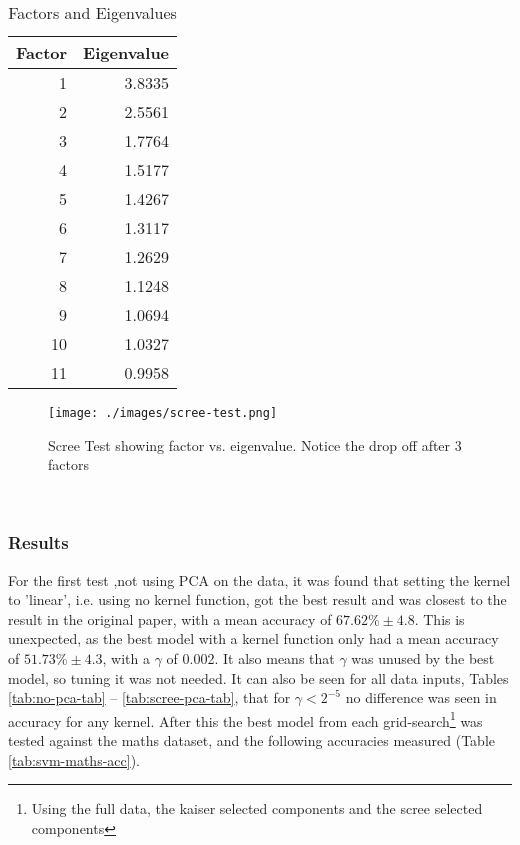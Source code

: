 \documentclass[12pt,a4paper,titlepage,twoside]{report}
\begin{document}
	\begin{minipage}[h]{\textwidth}	
		\begin{minipage}{0.3\textwidth}
		\begin{table}[H]
			\centering
			\begin{tabular}{|r|r|}
				\hline
				\textbf{Factor} & \textbf{Eigenvalue} \\ \hline
				1	&	3.8335 \\
				2	&	2.5561 \\
				3	&	1.7764 \\
				4	&	1.5177 \\
				5	&	1.4267 \\
				6	&	1.3117 \\
				7	&	1.2629 \\
				8	&	1.1248 \\
				9	&	1.0694 \\
				10 	&	1.0327 \\
				11	&   0.9958 \\
				\hline
			\end{tabular}
			\caption {Factors and Eigenvalues} 
			\label{tab:kaiser-tab} 
		\end{table}
		\end{minipage}%
		\hspace{0.6cm}%
		\begin{minipage}{0.7\textwidth}
		\begin{figure}[H]
			\centering
			\vspace{0.9cm}
			\texttt{[image: ./images/scree-test.png]}
			\caption{Scree Test showing factor vs. eigenvalue. Notice the drop off after 3 factors}
			\label{fig:scree-test}
		\end{figure}
		\end{minipage}
	\end{minipage} \\
	
\subsubsection*{Results}
	For the first test ,not using PCA on the data, it was found that setting the kernel to 'linear', i.e. using no kernel function, got the best result and was closest to the result in the original paper, with a mean accuracy of $67.62\% \pm4.8$. This is unexpected, as the best model with a kernel function only had a mean accuracy of $51.73\% \pm4.3$, with a $\gamma$ of 0.002. It also means that $\gamma$ was unused by the best model, so tuning it was not needed. It can also be seen for all data inputs, Tables \ref{tab:no-pca-tab} -- \ref{tab:scree-pca-tab}, that for $\gamma < 2^{-5}$ no difference was seen in accuracy for any kernel. After this the best model from each grid-search\footnote{Using the full data, the kaiser selected components and the scree selected components} was tested against the maths dataset, and the following accuracies measured (Table \ref{tab:svm-maths-acc}). \\
	
\end{document}
